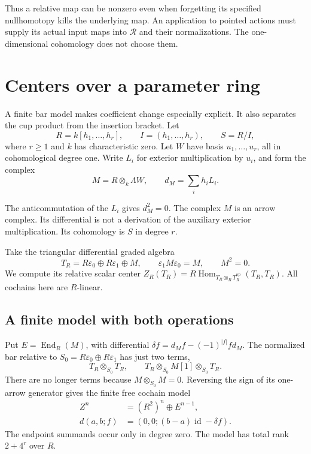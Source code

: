 Thus a relative map can be nonzero even
when forgetting its specified nullhomotopy
kills the underlying map. An application
to pointed actions must supply its actual
input maps into $\mathcal R$ and their
normalizations. The one-dimensional
cohomology does not choose them.

\section{Centers over a parameter ring}
\label{v4-arith:centers:sec:parameters}

A finite bar model makes coefficient change especially
explicit. It also separates the cup product from the
insertion bracket. Let
\[
 R=k[h_1,\ldots,h_r],\qquad I=(h_1,\ldots,h_r),
 \qquad S=R/I,
\]
where $r\geq1$ and $k$ has characteristic zero.
Let $W$ have basis $u_1,\ldots,u_r$, all in
cohomological degree one. Write $L_i$ for exterior
multiplication by $u_i$, and form the complex
\begin{equation}\label{v4-arith:centers:eq:parameter-arrow}
 M=R\otimes_k\Lambda W,\qquad d_M=\sum_i h_iL_i.
\end{equation}

The anticommutation of the $L_i$ gives $d_M^2=0$.
The complex $M$ is an arrow complex. Its differential
is not a derivation of the auxiliary exterior
multiplication. Its cohomology is $S$ in degree $r$.

Take the triangular differential graded algebra
\[
 T_R=R\varepsilon_0\oplus R\varepsilon_1\oplus M,
 \qquad \varepsilon_1M\varepsilon_0=M,\qquad M^2=0.
\]
We compute its relative scalar center
$Z_R(T_R)=R\operatorname{Hom}_{T_R\otimes_R T_R^{\mathrm{op}}}
(T_R,T_R)$. All cochains here are $R$-linear.

\subsection{A finite model with both operations}
\label{v4-arith:centers:subsec:finite-parameter}

Put $E=\operatorname{End}_R(M)$, with differential
$\delta f=d_Mf-(-1)^{|f|}fd_M$. The normalized
bar relative to
$S_0=R\varepsilon_0\oplus R\varepsilon_1$
has just two terms,
\[
 T_R\otimes_{S_0}T_R,\qquad
 T_R\otimes_{S_0}M[1]\otimes_{S_0}T_R.
\]
There are no longer terms because
$M\otimes_{S_0}M=0$. Reversing the sign of its
one-arrow generator gives the finite free
cochain model
\begin{equation}\label{v4-arith:centers:eq:parameter-complex}
\begin{split}
 Z^n&=(R^2)^n\oplus E^{n-1},\\
 d(a,b;f)&=(0,0;(b-a)\operatorname{id}-\delta f).
\end{split}
\end{equation}
The endpoint summands occur only in degree zero.
The model has total rank $2+4^r$ over $R$.

